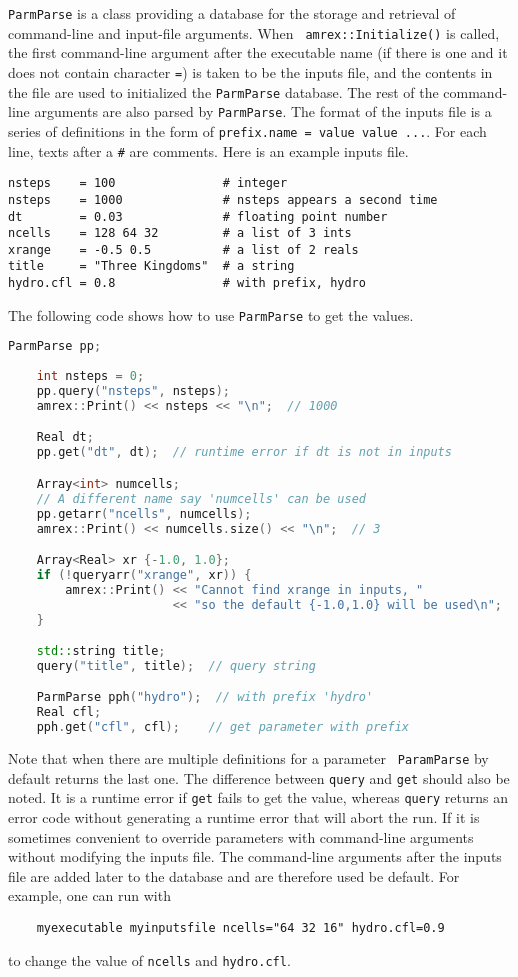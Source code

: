 {\tt ParmParse} is a class providing a database for the storage and
retrieval of command-line and input-file arguments.  When {\tt
  amrex::Initialize()} is called, the first command-line argument
after the executable name (if there is one and it does not contain
character {\tt =}) is taken to be the inputs file, and the contents in
the file are used to initialized the {\tt ParmParse} database.  The
rest of the command-line arguments are also parsed by {\tt ParmParse}.
The format of the inputs file is a series of definitions in the form
of {\tt prefix.name = value value ...}.  For each line, texts after a
{\tt \#} are comments.  Here is an example inputs file.
\begin{verbatim}
nsteps    = 100               # integer
nsteps    = 1000              # nsteps appears a second time
dt        = 0.03              # floating point number
ncells    = 128 64 32         # a list of 3 ints
xrange    = -0.5 0.5          # a list of 2 reals
title     = "Three Kingdoms"  # a string
hydro.cfl = 0.8               # with prefix, hydro 
\end{verbatim}
The following code shows how to use {\tt ParmParse} to get the values.
\begin{lstlisting}[language=cpp]
    ParmParse pp;
    
    int nsteps = 0;
    pp.query("nsteps", nsteps);
    amrex::Print() << nsteps << "\n";  // 1000

    Real dt;
    pp.get("dt", dt);  // runtime error if dt is not in inputs

    Array<int> numcells;
    // A different name say 'numcells' can be used
    pp.getarr("ncells", numcells);
    amrex::Print() << numcells.size() << "\n";  // 3

    Array<Real> xr {-1.0, 1.0};
    if (!queryarr("xrange", xr)) {
        amrex::Print() << "Cannot find xrange in inputs, "
                       << "so the default {-1.0,1.0} will be used\n";
    }

    std::string title;
    query("title", title);  // query string

    ParmParse pph("hydro");  // with prefix 'hydro'
    Real cfl;
    pph.get("cfl", cfl);    // get parameter with prefix
\end{lstlisting}
Note that when there are multiple definitions for a parameter {\tt
  ParamParse} by default returns the last one.  The difference between
{\tt query} and {\tt get} should also be noted.  It is a runtime error
if {\tt get} fails to get the value, whereas {\tt query} returns an
error code without generating a runtime error that will abort the run.
If it is sometimes convenient to override parameters with command-line
arguments without modifying the inputs file.  The command-line
arguments after the inputs file are added later to the database and
are therefore used be default.  For example, one can run with
\begin{verbatim}
    myexecutable myinputsfile ncells="64 32 16" hydro.cfl=0.9
\end{verbatim}
to change the value of {\tt ncells} and {\tt hydro.cfl}.

